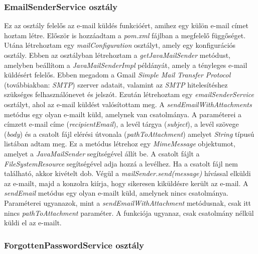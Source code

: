 \subsubsection{EmailSenderService osztály}

Ez az osztály felelős az e-mail küldés funkcióért, amihez egy külön e-mail címet hoztam létre. Először is hozzáadtam a \textit{pom.xml} fájlban a megfelelő függőséget. Utána létrehoztam egy \textit{mailConfiguration} osztályt, amely egy konfigurációs osztály. Ebben az osztályban létrehoztam a \textit{getJavaMailSender} metódust, amelyben beállítom a \textit{JavaMailSenderImpl} példányát, amely a tényleges e-mail küldésért felelős. Ebben megadom a Gmail \textit{Simple Mail Transfer Protocol} (továbbiakban: \textit{SMTP}) \cite{SMTP} szerver adatait, valamint az \textit{SMTP} hitelesítéshez szükséges felhasználónevet és jelszót. Ezután létrehoztam egy \textit{emailSenderService} osztályt, ahol az e-mail küldést valósítottam meg. A \textit{sendEmailWithAttachments} metódus egy olyan e-mailt küld, amelynek van csatolmánya. A paraméterei a címzett e-mail címe (\textit{recipientEmail}), a levél tárgya (\textit{subject}), a levél szövege (\textit{body}) és a csatolt fájl elérési útvonala (\textit{pathToAttachment}) amelyet \textit{String} típusú listában adtam meg. Ez a metódus létrehoz egy \textit{MimeMessage} objektumot, amelyet a \textit{JavaMailSender} segítségével állít be. A csatolt fájlt a \textit{FileSystemResource} segítségével adja hozzá a levélhez. Ha a csatolt fájl nem található, akkor kivételt dob. Végül a \textit{mailSender.send(message)} hívással elküldi az e-mailt, majd a konzolra kiírja, hogy sikeresen kiküldésre került az e-mail. A \textit{sendEmail} metódus egy olyan e-mailt küld, amelynek nincs csatolmánya. Paraméterei ugyanazok, mint a \textit{sendEmailWithAttachment} metódusnak, csak itt nincs \textit{pathToAttachment} paraméter. A funkciója ugyanaz, csak csatolmány nélkül küldi el az e-mailt.

\subsubsection{ForgottenPasswordService osztály}


